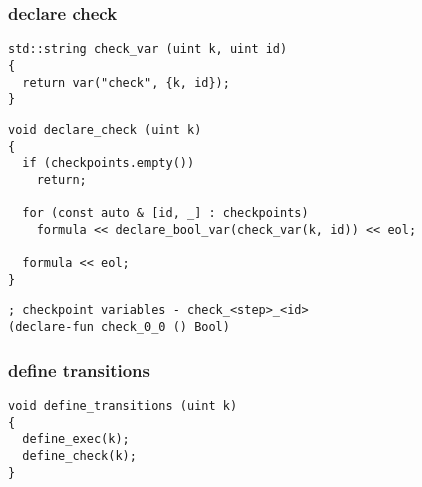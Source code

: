 \subsubsection{declare check}

\begin{algorithm}[H]
\end{algorithm}

\begin{algorithm}[H]
\end{algorithm}

\begin{lstlisting}[style=c++]
std::string check_var (uint k, uint id)
{
  return var("check", {k, id});
}
\end{lstlisting}

\begin{lstlisting}[style=c++]
void declare_check (uint k)
{
  if (checkpoints.empty())
    return;

  for (const auto & [id, _] : checkpoints)
    formula << declare_bool_var(check_var(k, id)) << eol;

  formula << eol;
}
\end{lstlisting}

\begin{lstlisting}[language=SMTLib]
; checkpoint variables - check_<step>_<id>
(declare-fun check_0_0 () Bool)
\end{lstlisting}

\subsubsection{define transitions}


\begin{algorithm}[H]
\end{algorithm}

\begin{lstlisting}[style=c++]
void define_transitions (uint k)
{
  define_exec(k);
  define_check(k);
}
\end{lstlisting}

